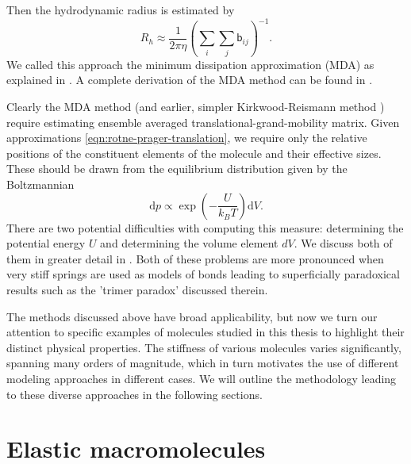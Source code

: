 \documentclass{doctoral}
\newcommand{\dd}{\mathrm{d}}
\newcommand{\mm}[1]{\bm{\mathsf{#1}}} %
\begin{document}
Then the hydrodynamic radius is estimated by
\begin{equation}
    R_h \approx \frac{1}{2 \pi \eta} \left( \sum_i \sum_j \mm{b}_{ij} \right)^{-1}.
\end{equation}
We called this approach the minimum dissipation approximation (MDA) as explained in \textcite{Waszkiewicz_2024_mda}.
A complete derivation of the MDA method can be found in \textcite{Cichocki_2019}.

Clearly the MDA method (and earlier, simpler Kirkwood-Reismann method \cite{Kirkwood_1948}) require estimating ensemble averaged translational-grand-mobility matrix.
Given approximations \eqref{eqn:rotne-prager-translation}, we require only the relative positions of the constituent elements of the molecule and their effective sizes.
These should be drawn from the equilibrium distribution given by the Boltzmannian
\begin{equation}
    \dd p \propto \exp \left(- \frac{U}{k_B T} \right) \dd V.
\end{equation}
There are two potential difficulties with computing this measure: determining the potential energy $U$ and determining the volume element $dV$.
We discuss both of them in greater detail in \textcite{Waszkiewicz_2024_trimer}.
Both of these problems are more pronounced when very stiff springs are used as models of bonds leading to superficially paradoxical results such as the 'trimer paradox' discussed therein.

The methods discussed above have broad applicability, but now we turn our attention to specific examples of molecules studied in this thesis to highlight their distinct physical properties.
The stiffness of various molecules varies significantly, spanning many orders of magnitude, which in turn motivates the use of different modeling approaches in different cases.
We will outline the methodology leading to these diverse approaches in the following sections.

\section{Elastic macromolecules}
\end{document}
